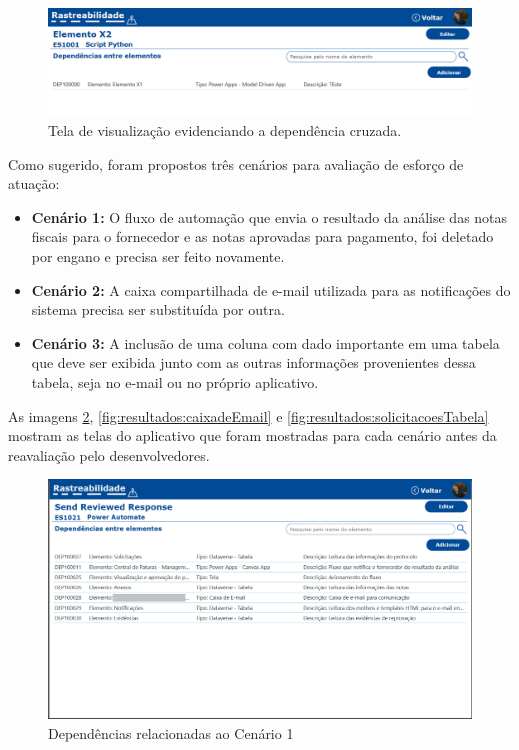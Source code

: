 	\begin{figure}[!htb]
		\centering
		\includegraphics[width=1\textwidth]{./figuras/dependenciaCruzada.png}
		\caption{Tela de visualização evidenciando a dependência cruzada.}
		\label{fig:resultados:dependenciaCruzada}
	\end{figure}

	Como sugerido, foram propostos três cenários para avaliação de esforço de atuação:

	\begin{itemize}
		\item \textbf{Cenário 1:} O fluxo de automação que envia o resultado da análise das notas fiscais para o fornecedor e as notas aprovadas para pagamento,
		foi deletado por engano e precisa ser feito novamente.
		\item \textbf{Cenário 2:} A caixa compartilhada de e-mail utilizada para as notificações do sistema precisa ser substituída por outra.
		\item \textbf{Cenário 3:} A inclusão de uma coluna com dado importante em uma tabela que deve ser exibida junto com as outras informações provenientes dessa tabela, seja no e-mail ou no próprio aplicativo.
	\end{itemize}

	As imagens \ref{fig:resultados:sendReviewedResponse}, \ref{fig:resultados:caixadeEmail} e \ref{fig:resultados:solicitacoesTabela} mostram as telas do aplicativo
	que foram mostradas para cada cenário antes da reavaliação pelo desenvolvedores.

	\begin{figure}[!h]
		\centering
		\includegraphics[width=1\textwidth]{./figuras/sendReviewedResponse.png}
		\caption{Dependências relacionadas ao Cenário 1}
		\label{fig:resultados:sendReviewedResponse}
	\end{figure}

